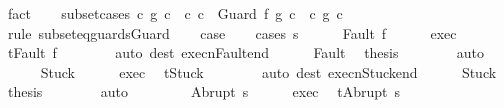 \begin{isabellebody}
\ fact\isanewline
\ \ \isamarkupfalse%
\ subset{\isacharunderscore}cases{\isacharcolon}\ {\isachardoublequoteopen}{\isacharparenleft}c\ {\isasymsubseteq}\isactrlsub g\ c{\isacharprime}{\isacharparenright}\ {\isasymor}\ {\isacharparenleft}{\isasymexists}c{\isacharprime}{\isacharprime}{\isachardot}\ c\ {\isacharequal}\ Guard\ f{\isacharprime}\ g{\isacharprime}\ c{\isacharprime}{\isacharprime}\ {\isasymand}\ {\isacharparenleft}c{\isacharprime}{\isacharprime}\ {\isasymsubseteq}\isactrlsub g\ c{\isacharprime}{\isacharparenright}{\isacharparenright}{\isachardoublequoteclose}\isanewline
\ \ \ \ \isamarkupfalse%
\ {\isacharparenleft}rule\ subseteq{\isacharunderscore}guards{\isacharunderscore}Guard{\isacharparenright}\isanewline
\ \ \isamarkupfalse%
\ {\isacharquery}case\isanewline
\ \ \isamarkupfalse%
\ {\isacharparenleft}cases\ {\isachardoublequoteopen}s{\isachardoublequoteclose}{\isacharparenright}\isanewline
\ \ \ \ \isamarkupfalse%
\ {\isacharparenleft}Fault\ f{\isacharparenright}\isanewline
\ \ \ \ \isamarkupfalse%
\ exec\ \isamarkupfalse%
\ {\isachardoublequoteopen}t{\isacharequal}Fault\ f{\isachardoublequoteclose}\isanewline
\ \ \ \ \ \ \isamarkupfalse%
\ {\isacharparenleft}auto\ dest{\isacharcolon}\ execn{\isacharunderscore}Fault{\isacharunderscore}end{\isacharparenright}\isanewline
\ \ \ \ \isamarkupfalse%
\ Fault\ \isamarkupfalse%
\ {\isacharquery}thesis\isanewline
\ \ \ \ \ \ \isamarkupfalse%
\ auto\isanewline
\ \ \isamarkupfalse%
\isanewline
\ \ \ \ \isamarkupfalse%
\ Stuck\isanewline
\ \ \ \ \isamarkupfalse%
\ exec\ \isamarkupfalse%
\ {\isachardoublequoteopen}t{\isacharequal}Stuck{\isachardoublequoteclose}\isanewline
\ \ \ \ \ \ \isamarkupfalse%
\ {\isacharparenleft}auto\ dest{\isacharcolon}\ execn{\isacharunderscore}Stuck{\isacharunderscore}end{\isacharparenright}\isanewline
\ \ \ \ \isamarkupfalse%
\ Stuck\ \isamarkupfalse%
\ {\isacharquery}thesis\isanewline
\ \ \ \ \ \ \isamarkupfalse%
\ auto\isanewline
\ \ \isamarkupfalse%
\isanewline
\ \ \ \ \isamarkupfalse%
\ {\isacharparenleft}Abrupt\ s{\isacharprime}{\isacharparenright}\isanewline
\ \ \ \ \isamarkupfalse%
\ exec\ \isamarkupfalse%
\ {\isachardoublequoteopen}t{\isacharequal}Abrupt\ s{\isacharprime}{\isachardoublequoteclose}\isanewline

\end{isabellebody}
